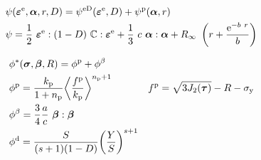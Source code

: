 \documentclass{beamer}
\begin{document}
\begin{frame}
\begin{align*}
& \psi(\fepse,\falpha,r,D) = \psi^{\mathrm{eD}}(\fepse,D) + \psi^{\mathrm{p}}(\falpha,r)\\
& \psi = \frac{1}{2} \ \fepse : (1-D) \ \ffC : \fepse +  \frac{1}{3} \ c \ \falpha : \falpha + R_\infty \ \left(r+\frac{\mathrm{e}^{-b\ r}}{b}\right)
\end{align*}

\newcommand{\phibeta}{\phi^{\beta}}
\begin{align*}
& \phi^\ast(\fsigma,\fbeta,R)= \phip + \phibeta\\
& \phip = \frac{\kp}{1+\np} {\left\langle \frac{\Fp}{\kp} \right\rangle}^{\np+1} \qquad
& \Fp= \sqrt{3 J_{2}(\ftau) } - R - \sigy \\
& \phibeta = \frac{3}{4} \frac{a}{c} \ \fbeta : \fbeta \\
& \phid = \frac{S}{(s+1)(1-D)}  {\left( \frac{Y}{S} \right)}^{s+1} \\
\end{align*}


\end{frame}
\end{document}
